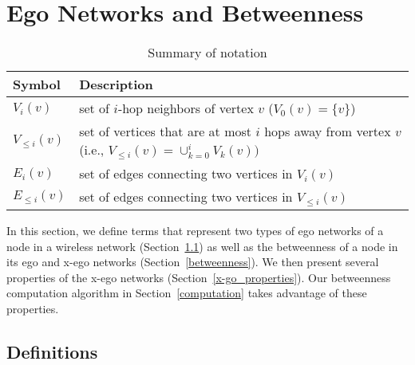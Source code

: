 \documentclass[journal]{IEEEtran}
\newcommand{\V}[2]{V_{#2}({#1})}
\newcommand{\LV}[2]{V_{\le #2}({#1})}
\newcommand{\E}[2]{E_{#2}({#1})}
\newcommand{\LE}[2]{E_{\le #2}({#1})}
\theoremstyle{definition}
\begin{document}


\section{Ego Networks and Betweenness}\label{een}

\begin{table}[t]
\center
\caption{Summary of notation}\label{table:symbols}
\small
  \begin{tabular}{| p{0.9cm} | p{6.8cm} |}
    \hline
	Symbol & Description \\  
    \hline
    \hline
	$\V{v}{i}$ & set of $i$-hop neighbors of vertex $v$ ($\V{v}{0} = \{ v \}$)\\
	$\LV{v}{i}$ & set of vertices that are at most $i$ hops away from vertex $v$ (i.e., $\LV{v}{i} = \cup_{k = 0}^{i} \V{v}{k}) $\\
	$\E{v}{i}$ & set of edges connecting two vertices in $\V{v}{i}$\\	
	$\LE{v}{i}$ & set of edges connecting two vertices in $\LV{v}{i}$\\
    \hline
  \end{tabular}
\end{table}

In this section, we define terms that represent two types of ego networks of a node in a wireless network (Section~\ref{x-ego_definition}) as well as the betweenness of a node in its ego and x-ego networks (Section~\ref{betweenness}).
We then present several properties of the x-ego networks (Section~\ref{x-go_properties}).
Our betweenness computation algorithm in Section~\ref{computation} takes advantage of these properties.

\subsection{Definitions}\label{x-ego_definition}
\end{document}
